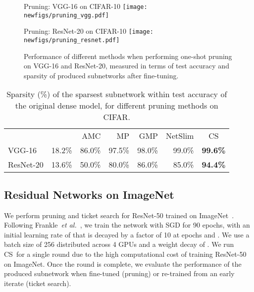 \documentclass{article}
\newcommand{\citet}[1]{\cite{#1}}
\newcommand{\etal}{\textit{et al.}}
\newcommand{\methodacro}{CS}
\begin{document}
\begin{figure*}[!bt]
    \centering
    \begin{minipage}[l]{0.49\linewidth}
      \centering
      \tiny\textsf{Pruning: VGG-16 on CIFAR-10}
      \texttt{[image: newfigs/pruning\_vgg.pdf]}
    \end{minipage}
    \hfill
    \begin{minipage}[l]{0.49\linewidth}
      \centering
      \tiny\textsf{Pruning: ResNet-20 on CIFAR-10}
      \texttt{[image: newfigs/pruning\_resnet.pdf]}
    \end{minipage}
    \caption{Performance of different methods when performing one-shot pruning on VGG-16 and ResNet-20, measured in terms of test accuracy and sparsity of produced subnetworks after fine-tuning.}
    \label{fig:pruning}
\end{figure*}

\begin{table}[!tb]
\setlength{\tabcolsep}{4pt}
\begin{minipage}{0.385\linewidth}
\vspace{-6pt}
\caption{Sparsity (\%) of the sparsest subnetwork within  test accuracy of the original dense model, for different pruning methods on CIFAR.}
\label{tab:pruning}
\end{minipage}
\hfill
\begin{minipage}{0.60\linewidth}
\vspace{0pt}
\footnotesize
\centering
\begin{tabular}{@{}lrrrrrc@{}}
\toprule
 & \citet{sparsityl0} & AMC & MP & GMP & NetSlim & CS \\ \cmidrule{2-7}
VGG-16 & 18.2\% & 86.0\% & 97.5\% & 98.0\% & 99.0\% & \textbf{99.6\%}  \\
ResNet-20 & 13.6\% & 50.0\% & 80.0\% & 86.0\% & 85.0\% & \textbf{94.4\%} \\ \bottomrule
\end{tabular}
\end{minipage}
\end{table}





\subsection{Residual Networks on ImageNet}
\label{sec:imagenet}

We perform pruning and ticket search for ResNet-50 trained on ImageNet~\cite{imagenet}. Following Frankle~\etal~\citet{lth2}, we train the network with SGD for 90 epochs, with an initial learning rate of  that is decayed by a factor of 10 at epochs  and . We use a batch size of 256 distributed across 4 GPUs and a weight decay of . We run \methodacro~for a single round due to the high computational cost of training ResNet-50 on ImageNet. Once the round is complete, we evaluate the performance of the produced subnetwork when fine-tuned (pruning) or re-trained from an early iterate (ticket search).
\end{document}
